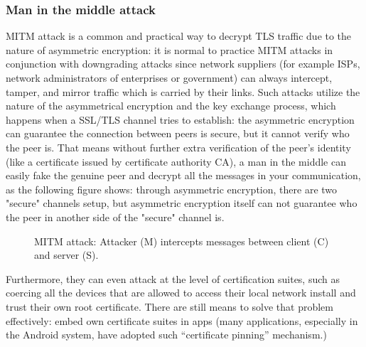\documentclass[conference]{IEEEtran}
\begin{document}
\subsubsection{Man in the middle attack}\label{sec:mitm}
MITM attack is a common and practical way to decrypt TLS traffic due to the nature of asymmetric encryption: 
it is normal to practice MITM attacks in conjunction with downgrading attacks since network suppliers (for example ISPs, network administrators of enterprises or government) can always intercept, tamper, and mirror traffic which is carried by their links. 
Such attacks utilize the nature of the asymmetrical encryption and the key exchange process, which happens when a SSL/TLS channel tries to establish: the asymmetric encryption can guarantee the connection between peers is secure, but it cannot verify who the peer is. That means without further extra verification of the peer's identity (like a certificate issued by certificate authority CA), a man in the middle can easily fake the genuine peer and decrypt all the messages in your communication, as the following figure shows: through asymmetric encryption, there are two "secure" channels setup, but asymmetric encryption itself can not guarantee who the peer in another side of the "secure" channel is.

\begin{figure}[!h]
\centering

\caption{MITM attack: Attacker (M) intercepts messages between client (C) and server (S).}
\label{fig:mitm}
\end{figure}

Furthermore, they can even attack at the level of certification suites, such as coercing all the devices that are allowed to access their local network install and trust their own root certificate. There are still means to solve that problem effectively: embed own certificate suites in apps (many applications, especially in the Android system, have adopted such “certificate pinning” mechanism.) 
\end{document}
